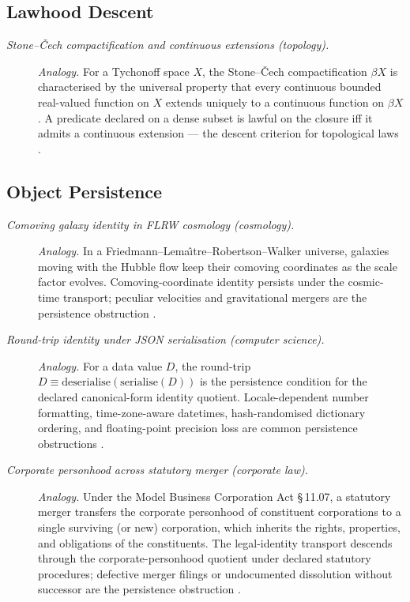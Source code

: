 \subsection*{ Lawhood Descent}
\begingroup\small
\begin{description}
\item[\emph{Stone--{\v C}ech compactification and continuous
extensions (topology).}] \textit{Analogy.}
For a Tychonoff space \(X\), the Stone--{\v C}ech
compactification \(\beta X\) is characterised by the universal
property that every continuous bounded real-valued function on
\(X\) extends uniquely to a continuous function on \(\beta X\).
A predicate declared on a dense subset is lawful on the closure
iff it admits a continuous extension --- the  descent
criterion for topological laws
\citep{Cech1937BicompactSpaces}.
\end{description}
\endgroup

\subsection*{ Object Persistence}
\begingroup\small
\begin{description}
\item[\emph{Comoving galaxy identity in FLRW cosmology
(cosmology).}] \textit{Analogy.}
In a Friedmann--Lema{\^\i}tre--Robertson--Walker universe, galaxies
moving with the Hubble flow keep their comoving coordinates as the
scale factor evolves.  Comoving-coordinate identity persists under
the cosmic-time transport; peculiar velocities and gravitational
mergers are the persistence obstruction
\citep{Friedmann1922KrummungRaumes}.

\item[\emph{Round-trip identity under {JSON} serialisation
(computer science).}] \textit{Analogy.}
For a data value \(D\), the round-trip
\(D\equiv\mathrm{deserialise}(\mathrm{serialise}(D))\) is the 
persistence condition for the declared canonical-form identity
quotient.  Locale-dependent number formatting, time-zone-aware
datetimes, hash-randomised dictionary ordering, and floating-point
precision loss are common persistence obstructions
\citep{Crockford2006JSON}.

\item[\emph{Corporate personhood across statutory merger
(corporate law).}] \textit{Analogy.}
Under the Model Business Corporation Act \S\,11.07, a statutory
merger transfers the corporate personhood of constituent
corporations to a single surviving (or new) corporation, which
inherits the rights, properties, and obligations of the
constituents.  The legal-identity transport descends through the
corporate-personhood quotient under declared statutory procedures;
defective merger filings or undocumented dissolution without
successor are the persistence obstruction
\citep{MBCA2016Section1107}.
\end{description}
\endgroup

